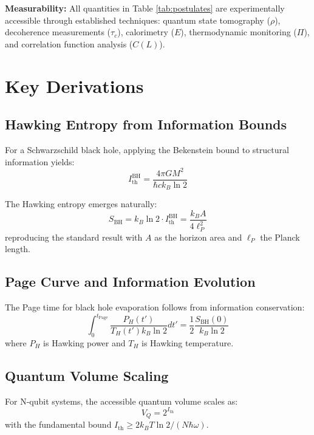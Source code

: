 \documentclass[twocolumn,10pt]{IEEEtran}
\begin{document}
\textbf{Measurability:} All quantities in Table \ref{tab:postulates} are experimentally accessible through established techniques: quantum state tomography ($\rho$), decoherence measurements ($\tau_c$), calorimetry ($E$), thermodynamic monitoring ($\Pi$), and correlation function analysis ($C(L)$).

\section{Key Derivations}

\subsection{Hawking Entropy from Information Bounds}

For a Schwarzschild black hole, applying the Bekenstein bound to structural information yields:
\begin{equation}
I_{\text{th}}^{\text{BH}} = \frac{4\pi GM^2}{\hbar c k_B \ln 2}
\end{equation}

The Hawking entropy emerges naturally:
\begin{equation}
S_{\text{BH}} = k_B \ln 2 \cdot I_{\text{th}}^{\text{BH}} = \frac{k_B A}{4\ell_P^2}
\end{equation}
reproducing the standard result with $A$ as the horizon area and $\ell_P$ the Planck length.

\subsection{Page Curve and Information Evolution}

The Page time for black hole evaporation follows from information conservation:
\begin{equation}
\int_0^{t_{\text{Page}}} \frac{P_H(t')}{T_H(t') k_B \ln 2} dt' = \frac{1}{2} \frac{S_{\text{BH}}(0)}{k_B \ln 2}
\end{equation}
where $P_H$ is Hawking power and $T_H$ is Hawking temperature.

\subsection{Quantum Volume Scaling}

For N-qubit systems, the accessible quantum volume scales as:
\begin{equation}
V_Q = 2^{I_{\text{th}}}
\end{equation}
with the fundamental bound $I_{\text{th}} \geq 2k_B T \ln 2 / (N\hbar\omega)$.
\end{document}
